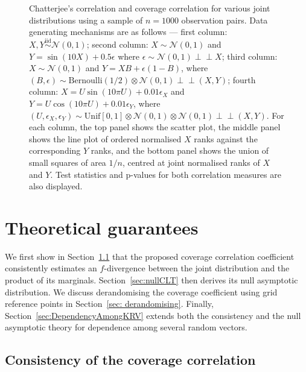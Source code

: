 \documentclass[11pt]{article}
\newcommand{\indep}{\perp\!\!\!\perp}
\newcommand{\iid}{\stackrel{\mathrm{iid}}\sim}
\begin{document}
\begin{figure}[htbp]
\caption{\label{Fig:ChatterjeePlot}Chatterjee's correlation and coverage correlation for various joint distributions using a sample of $n=1000$ observation pairs.  Data generating mechanisms are as follows --- first column: $X,Y\iid \mathcal{N}(0,1)$; second column: $X\sim \mathcal{N}(0,1)$ and $Y=\sin(10X) + 0.5\epsilon$ where $\epsilon\sim \mathcal{N}(0,1)\indep X$; third column: $X\sim \mathcal{N}(0,1)$ and $Y = XB + \epsilon(1-B)$, where $(B,\epsilon)\sim \mathrm{Bernoulli}(1/2)\otimes \mathcal{N}(0,1) \indep (X,Y)$; fourth column: $X = U\sin(10\pi U) + 0.01\epsilon_X$ and $Y=U \cos(10\pi U) + 0.01\epsilon_Y$, where $(U,\epsilon_X,\epsilon_Y)\sim \mathrm{Unif}[0,1]\otimes \mathcal{N}(0,1)\otimes \mathcal{N}(0,1)\indep (X,Y)$. For each column, the top panel shows the scatter plot, the middle panel shows the line plot of ordered normalised $X$ ranks against the corresponding $Y$ ranks, and the bottom panel shows the union of small squares of area $1/n$, centred at joint normalised ranks of $X$ and $Y$. Test statistics and p-values for both correlation measures are also displayed.}
\end{figure}


\section{Theoretical guarantees}
\label{sec:theory}
We first show in Section~\ref{sec:consistency} that the proposed coverage correlation coefficient consistently estimates an $f$-divergence between the joint distribution and the product of its marginals. Section~\ref{sec:nullCLT} then derives its null asymptotic distribution. We discuss derandomising the coverage coefficient using grid reference points in Section~\ref{sec: derandomising}. Finally, Section~\ref{sec:DependencyAmongKRV} extends both the consistency and the null asymptotic theory for dependence among several random vectors.
\subsection{Consistency of the coverage correlation}\label{sec:consistency}
\end{document}
